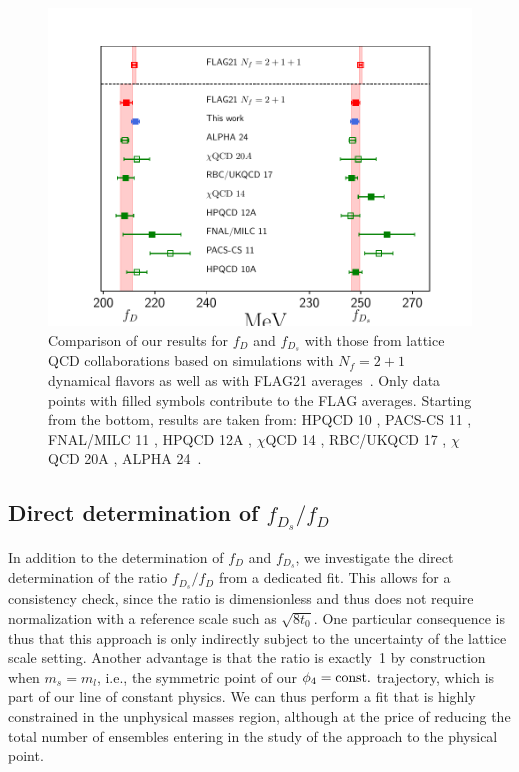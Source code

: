 \begin{figure}
	\centering
	\includegraphics[scale=0.70]{./cap6/figs/fds/fds_comparison.pdf}
	\caption{Comparison of our results for $f_D$ and $f_{D_s}$  with those from lattice QCD collaborations based on simulations with $N_f=2+1$ dynamical flavors as well as with FLAG21 averages~\cite{FlavourLatticeAveragingGroupFLAG:2021npn}.
          Only data points with filled symbols contribute to  the FLAG averages. Starting from the bottom, results are taken from: HPQCD 10 \cite{Davies:2010ip}, PACS-CS 11 \cite{PACS-CS:2011ngu}, FNAL/MILC 11 \cite{FermilabLattice:2011njy}, HPQCD 12A \cite{Na:2012iu}, $\chi$QCD 14 \cite{Yang:2014sea}, RBC/UKQCD 17 \cite{Boyle:2017jwu},  $\chi$QCD 20A \cite{Chen:2020qma}, ALPHA 24~\citep{Kuberski:2024pms}.
          }
	\label{fig:fds_comparison}
\end{figure}


\subsection{Direct determination of $f_{D_s}/f_D$}

In addition to the determination of $f_D$ and $f_{D_s}$, we investigate the direct determination
of the ratio $f_{D_s}/f_D$ from a dedicated fit. This allows for a consistency check, since
the ratio is dimensionless and thus does not require normalization with a reference scale
such as $\sqrt{8t_0}$. One particular consequence is thus that this approach is only
indirectly subject to the uncertainty of the lattice scale setting. Another advantage
is that the ratio is exactly~1 by construction when $m_s=m_l$, i.e., the symmetric
point of our $\phi_4={\rm const.}$ trajectory, which is part of our line of constant
physics. We can thus perform a fit that is highly constrained in the unphysical masses
region, although at the price of reducing the total number of ensembles entering in the study of the approach to the physical point.

